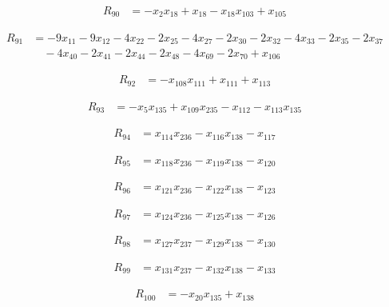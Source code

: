 \documentclass[11pt,letterpaper]{article}
\theoremstyle{definition}
\theoremstyle{remark}
\begin{document}
\begin{align*}
R_{90} &= -x_{2} x_{18} +x_{18} -x_{18} x_{103} +x_{105}
\end{align*}

\begin{align*}
R_{91} &= -9 x_{11} -9 x_{12} -4 x_{22} -2 x_{25} -4 x_{27} -2 x_{30} -2 x_{32} -4 x_{33} -2 x_{35} -2 x_{37} \\
&\quad -4 x_{40} -2 x_{41} -2 x_{44} -2 x_{48} -4 x_{69} -2 x_{70} +x_{106}
\end{align*}

\begin{align*}
R_{92} &= -x_{108} x_{111} +x_{111} +x_{113}
\end{align*}

\begin{align*}
R_{93} &= -x_{5} x_{135} +x_{109} x_{235} -x_{112} -x_{113} x_{135}
\end{align*}

\begin{align*}
R_{94} &= x_{114} x_{236} -x_{116} x_{138} -x_{117}
\end{align*}

\begin{align*}
R_{95} &= x_{118} x_{236} -x_{119} x_{138} -x_{120}
\end{align*}

\begin{align*}
R_{96} &= x_{121} x_{236} -x_{122} x_{138} -x_{123}
\end{align*}

\begin{align*}
R_{97} &= x_{124} x_{236} -x_{125} x_{138} -x_{126}
\end{align*}

\begin{align*}
R_{98} &= x_{127} x_{237} -x_{129} x_{138} -x_{130}
\end{align*}

\begin{align*}
R_{99} &= x_{131} x_{237} -x_{132} x_{138} -x_{133}
\end{align*}

\begin{align*}
R_{100} &= -x_{20} x_{135} +x_{138}
\end{align*}
\end{document}
